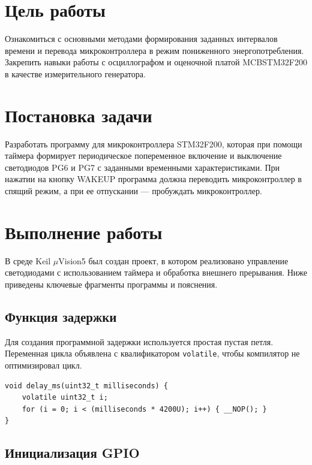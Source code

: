 \section{Цель работы}

Ознакомиться с основными методами формирования заданных интервалов времени и перевода микроконтроллера в режим пониженного энергопотребления.
Закрепить навыки работы с осциллографом и оценочной платой MCBSTM32F200 в качестве измерительного генератора.

\section{Постановка задачи}

Разработать программу для микроконтроллера STM32F200, которая при помощи таймера формирует периодическое попеременное включение и выключение светодиодов PG6 и PG7 с заданными временными характеристиками.
При нажатии на кнопку WAKEUP программа должна переводить микроконтроллер в спящий режим, а при ее отпускании --- пробуждать микроконтроллер.

\section{Выполнение работы}

В среде Keil $\mu$Vision5 был создан проект, в котором реализовано управление светодиодами с использованием таймера и обработка внешнего прерывания.
Ниже приведены ключевые фрагменты программы и пояснения.

\subsection{Функция задержки}

Для создания программной задержки используется простая пустая петля.
Переменная цикла объявлена с квалификатором \verb|volatile|, чтобы компилятор не оптимизировал цикл.

\begin{listing}[H]
\caption{Delay function (milliseconds)}
\begin{verbatim}
void delay_ms(uint32_t milliseconds) {
    volatile uint32_t i;
    for (i = 0; i < (milliseconds * 4200U); i++) { __NOP(); }
}
\end{verbatim}
\end{listing}

\subsection{Инициализация GPIO}

